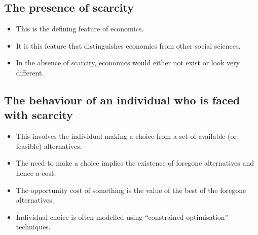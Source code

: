 \documentclass[letterpaper,10pt,english]{jupyterBook}
\begin{document}
\subsection{The presence of scarcity}
\label{\detokenize{01.intro_to_economics:the-presence-of-scarcity}}\begin{itemize}
\item {} 
\sphinxAtStartPar
This is the defining feature of economics.

\item {} 
\sphinxAtStartPar
It is this feature that distinguishes economics from other social sciences.

\item {} 
\sphinxAtStartPar
In the absence of scarcity, economics would either not exist or look very different.

\end{itemize}


\subsection{The behaviour of an individual who is faced with scarcity}
\label{\detokenize{01.intro_to_economics:the-behaviour-of-an-individual-who-is-faced-with-scarcity}}\begin{itemize}
\item {} 
\sphinxAtStartPar
This involves the individual making a choice from a set of available (or feasible) alternatives.

\item {} 
\sphinxAtStartPar
The need to make a choice implies the existence of foregone alternatives and hence a cost.

\item {} 
\sphinxAtStartPar
The opportunity cost of something is the value of the best of the foregone alternatives.

\item {} 
\sphinxAtStartPar
Individual choice is often modelled using “constrained optimisation” techniques.

\end{itemize}
\end{document}
